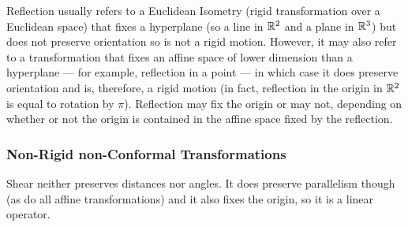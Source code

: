 \documentclass[MathsNotesBase.tex]{subfiles}
\begin{document}
{	
	Reflection usually refers to a Euclidean Isometry (rigid transformation over a Euclidean space) that fixes a hyperplane (so a line in $\mathbb{R}^{2}$ and a plane in $\mathbb{R}^{3}$) but does not preserve orientation so is not a rigid motion. However, it may also refer to a transformation that fixes an affine space of lower dimension than a hyperplane --- for example, reflection in a point --- in which case it does preserve orientation and is, therefore, a rigid motion (in fact, reflection in the origin in $\mathbb{R}^{2}$ is equal to rotation by $\pi$). Reflection may fix the origin or may not, depending on whether or not the origin is contained in the affine space fixed by the reflection.
	
	\bigskip
	\subsubsection{Non-Rigid non-Conformal Transformations}
	\bigskip
	Shear neither preserves distances nor angles. It does preserve parallelism though (as do all affine transformations) and it also fixes the origin, so it is a linear operator.
	
	\bigskip\bigskip
}	
\end{document}
